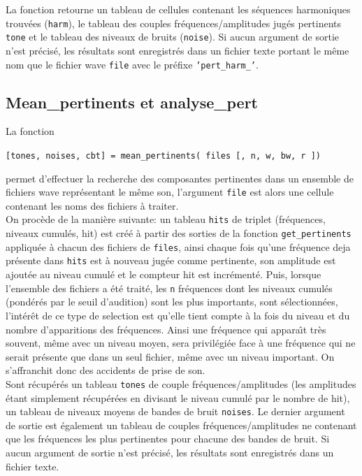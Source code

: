     La fonction retourne un tableau de cellules contenant les s{\'e}quences
    harmoniques trouv{\'e}es ({\tt harm}), le tableau des couples
    fr{\'e}quences/amplitudes jug{\'e}s pertinents {\tt tone} et le tableau des niveaux
    de bruits ({\tt noise}). Si aucun argument de sortie n'est
    pr{\'e}cis{\'e}, les r{\'e}sultats sont enregistr{\'e}s dans un fichier texte
    portant le m{\^e}me nom que le fichier wave {\tt file} avec le
    pr{\'e}fixe {\tt 'pert\_harm\_'}.


    \newpage
    \subsection{Mean\_pertinents et analyse\_pert}
    \label{meanpertinents}
    La fonction
    \begin{center}
    {\tt [tones, noises, cbt] = mean\_pertinents( files [, n, w, bw, r ])}
    \end{center}
    permet d'effectuer la recherche des composantes pertinentes dans
    un ensemble de fichiers wave repr{\'e}sentant le m{\^e}me son,
    l'argument {\tt file} est alors une cellule contenant les noms
    des fichiers {\`a} traiter.\\

    On proc{\`e}de de la mani{\`e}re suivante: un tableau
    {\tt hits} de triplet (fr{\'e}quences, niveaux cumul{\'e}s, hit)
    est cr{\'e}{\'e} {\`a} partir des sorties de la fonction {\tt get\_pertinents}
    appliqu{\'e}e {\`a} chacun des fichiers de {\tt files}, ainsi chaque
    fois qu'une fr{\'e}quence deja pr{\'e}sente dans {\tt hits}
    est {\`a} nouveau jug{\'e}e comme pertinente, son amplitude est
    ajout{\'e}e
    au niveau cumul{\'e} et le compteur hit est incr{\'e}ment{\'e}. Puis,
    lorsque l'ensemble des fichiers a {\'e}t{\'e} trait{\'e}, les {\tt n}
    fr{\'e}quences dont les niveaux cumul{\'e}s (pond{\'e}r{\'e}s par le seuil
    d'audition) sont les plus importants, sont s{\'e}lectionn{\'e}es,
    l'int{\'e}r{\^e}t de ce type de selection est qu'elle tient compte {\`a}
    la fois du niveau et du nombre d'apparitions des fr{\'e}quences.
    Ainsi une fr{\'e}quence qui appara{\^\i}t tr{\`e}s souvent,
    m{\^e}me avec un niveau moyen, sera privil{\'e}gi{\'e}e face {\`a} une fr{\'e}quence qui ne serait
    pr{\'e}sente que dans un seul fichier, m{\^e}me avec un niveau
    important. On s'affranchit donc des accidents de prise de
    son.\\

    Sont r{\'e}cup{\'e}r{\'e}s un tableau {\tt tones} de couple
    fr{\'e}quences/amplitudes (les amplitudes {\'e}tant simplement
    r{\'e}cup{\'e}r{\'e}es en divisant le niveau cumul{\'e} par le nombre
    de hit), un tableau de niveaux moyens de bandes de bruit
    {\tt noises}. Le dernier argument de sortie est {\'e}galement
    un tableau de couples fr{\'e}quences/amplitudes ne contenant que
    les fr{\'e}quences les plus pertinentes pour chacune
    des bandes de bruit. Si aucun argument de sortie n'est pr{\'e}cis{\'e},
    les r{\'e}sultats sont enregistr{\'e}s dans un fichier texte.\\

